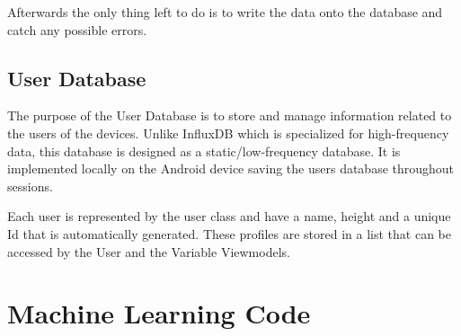Afterwards the only thing left to do is to write the data onto the database and catch any possible errors.

\subsection{User Database}
\label{ssec:android_users}

The purpose of the User Database is to store and manage information related to the users of the devices. Unlike InfluxDB which is specialized for high-frequency data, this database is designed as a static/low-frequency database. 
It is implemented locally on the Android device saving the users database throughout sessions. 

Each user is represented by the user class and have a name, height and a unique Id that is automatically generated. These profiles are stored in a list that can be accessed by the User and the Variable Viewmodels.




\section{Machine Learning Code}
\label{sec:ml_code}

